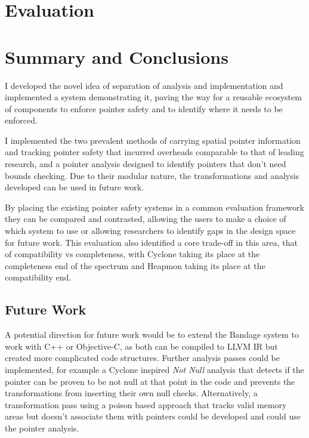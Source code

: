 \documentclass[a4paper,12pt,twoside,openright]{report}
\begin{document}
\chapter{Evaluation} 


\chapter{Summary and Conclusions} 

I developed the novel idea of separation of analysis and implementation and implemented a system demonstrating it, paving the way for a reusable ecosystem of components to enforce pointer safety and to identify where it needs to be enforced.

I implemented the two prevalent methods of carrying spatial pointer information and tracking pointer safety that incurred overheads comparable to that of leading research, and a pointer analysis designed to identify pointers that don't need bounds checking.
Due to their modular nature, the transformations and analysis developed can be used in future work.

By placing the existing pointer safety systems in a common evaluation framework they can be compared and contrasted, allowing the users to make a choice of which system to use or allowing researchers to identify gaps in the design space for future work.
This evaluation also identified a core trade-off in this area, that of compatibility vs completeness, with Cyclone taking its place at the completeness end of the spectrum and Heapmon taking its place at the compatibility end.

\section{Future Work}

A potential direction for future work would be to extend the Bandage system to work with C++ or Objective-C, as both can be compiled to LLVM IR but created more complicated code structures.
Further analysis passes could be implemented, for example a Cyclone inspired \textit{Not Null} analysis that detects if the pointer can be proven to be not null at that point in the code and prevents the transformations from inserting their own null checks.
Alternatively, a transformation pass using a poison based approach that tracks valid memory areas but doesn't associate them with pointers could be developed and could use the pointer analysis.

\appendix
\singlespacing

 
\begingroup
\raggedright
 
\endgroup
\end{document}
